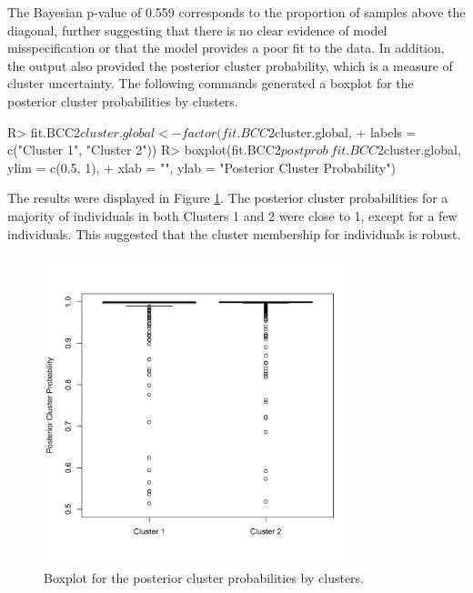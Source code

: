 The Bayesian p-value of 0.559 corresponds to the proportion of samples above the diagonal, further suggesting that there is no clear evidence of model misspecification or that the model provides a poor fit to the data. In addition, the output also provided the posterior cluster probability, which is a measure of cluster uncertainty. The following commands generated a boxplot for the posterior cluster probabilities by clusters. 
\begin{example}
R> fit.BCC2$cluster.global <- factor(fit.BCC2$cluster.global,
+        labels = c("Cluster 1", "Cluster 2"))
R> boxplot(fit.BCC2$postprob ~ fit.BCC2$cluster.global, ylim = c(0.5, 1),
+        xlab = "", ylab = "Posterior Cluster Probability")
\end{example} 
The results were displayed in Figure \ref{fig:posterior_prob}. The posterior cluster probabilities for a majority of individuals in both Clusters 1 and 2 were close to 1, except for a few individuals. This suggested that the cluster membership for individuals is robust. 
\begin{figure}[t!]
\centering
\includegraphics[width=9cm,height=9cm]{./Figures/posterior_prob.JPEG}
\caption{\label{fig:posterior_prob}  Boxplot for the posterior cluster probabilities by clusters.}
\end{figure}
